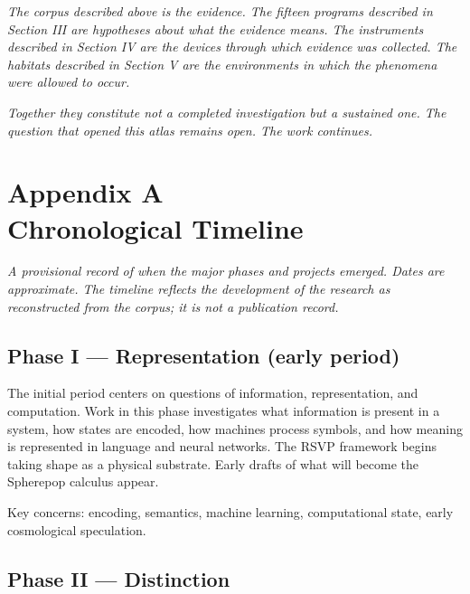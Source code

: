 \documentclass[12pt, openany]{book}
\begin{document}
\bigskip\bigskip

\noindent\textit{The corpus described above is the evidence. The fifteen programs described in Section III are hypotheses about what the evidence means. The instruments described in Section IV are the devices through which evidence was collected. The habitats described in Section V are the environments in which the phenomena were allowed to occur.}

\medskip

\noindent\textit{Together they constitute not a completed investigation but a sustained one. The question that opened this atlas remains open. The work continues.}

\cleardoublepage
\appendix

\chapter[Appendix A: Chronological Timeline]{Appendix A \\ Chronological Timeline}

\noindent\textit{A provisional record of when the major phases and projects
emerged. Dates are approximate. The timeline reflects the development of
the research as reconstructed from the corpus; it is not a publication
record.}

\bigskip

\section{Phase I — Representation (early period)}

The initial period centers on questions of information, representation,
and computation. Work in this phase investigates what information is
present in a system, how states are encoded, how machines process symbols,
and how meaning is represented in language and neural networks. The RSVP
framework begins taking shape as a physical substrate. Early drafts of
what will become the Spherepop calculus appear.

Key concerns: encoding, semantics, machine learning, computational state,
early cosmological speculation.

\section{Phase II — Distinction}
\end{document}
